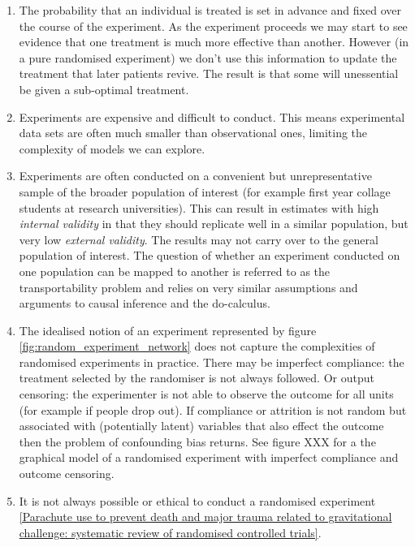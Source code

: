 \documentclass[11pt,a4paper,oneside]{book}
\theoremstyle{plain}
\theoremstyle{definition}
\begin{document}
\begin{enumerate}

\item The probability that an individual is treated is set in advance and fixed over the course of the experiment. As the experiment proceeds we may start to see evidence that one treatment is much more effective than another. However (in a pure randomised experiment) we don't use this information to update the treatment that later patients revive. The result is that some will unessential be given a sub-optimal treatment. 
\item Experiments are expensive and difficult to conduct. This means experimental data sets are often much smaller than observational ones, limiting the complexity of models we can explore.

\item Experiments are often conducted on a convenient but unrepresentative sample of the broader population of interest (for example first year collage students at research universities). This can result in estimates with high \emph{internal validity} \citep{Campbell1963} in that they should replicate well in a similar population, but very low \emph{external validity}. The results may not carry over to the general population of interest. The question of whether an experiment conducted on one population can be mapped to another is referred to as the transportability problem \citep{Bareinboim2013}  and relies on very similar assumptions and arguments to causal inference and the do-calculus. 

\item The idealised notion of an experiment represented by figure \ref{fig:random_experiment_network} does not capture the complexities of randomised experiments in practice. There may be imperfect compliance: the treatment selected by the randomiser is not always followed. Or output censoring: the experimenter is not able to observe the outcome for all units (for example if people drop out). If compliance or attrition is not random but associated with (potentially latent) variables that also effect the outcome then the problem of confounding bias returns. See figure XXX for a the graphical model of a randomised experiment with imperfect compliance and outcome censoring. 

\item It is not always possible or ethical to conduct a randomised experiment \cite{parachutes} \ref{Parachute use to prevent death and major trauma related to gravitational challenge: systematic review of randomised controlled trials}. 
\end{enumerate}
\end{document}
